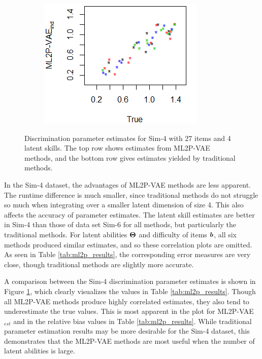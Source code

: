 \begin{figure}[h]
\begin{subfigure}{.32\textwidth}
    \end{subfigure}
    \begin{subfigure}{.32\textwidth}
      \centering
      \includegraphics[width=.9\linewidth]{img/ml_journal_results/4skills/vae_ind_disc_4skills_cropped.png}
    \end{subfigure}
    \caption{Discrimination parameter estimates for Sim-4 with 27 items and 4 latent skills. The top row shows estimates from ML2P-VAE methods, and the bottom row gives estimates yielded by traditional methods.}
    \label{fig:4skills_disc}
\end{figure}

In the Sim-4 dataset, the advantages of ML2P-VAE methods are less apparent. The runtime difference is much smaller, since traditional methods do not struggle so much when integrating over a smaller latent dimension of size 4. This also affects the accuracy of parameter estimates. The latent skill estimates are better in Sim-4 than those of data set Sim-6 for all methods, but particularly the traditional methods. For latent abilities $\boldsymbol{\Theta}$ and difficulty of items $\boldsymbol{b}$, all six methods produced similar estimates, and so these correlation plots are omitted. As seen in Table \ref{tab:ml2p_results}, the corresponding error measures are very close, though traditional methods are slightly more accurate.

A comparison between the Sim-4 discrimination parameter estimates is shown in Figure \ref{fig:4skills_disc}, which clearly visualizes the values in Table \ref{tab:ml2p_results}. Though all ML2P-VAE methods produce highly correlated estimates, they also tend to underestimate the true values. This is most apparent in the plot for ML2P-VAE$_{est}$ and in the relative bias values in Table \ref{tab:ml2p_results}. While traditional parameter estimation results may be more desirable for the Sim-4 dataset, this demonstrates that the ML2P-VAE methods are most useful when the number of latent abilities is large.

